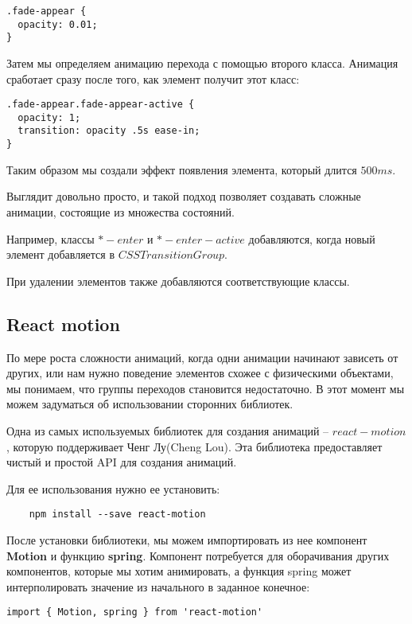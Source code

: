 \begin{lstlisting}
.fade-appear {
  opacity: 0.01;
}
\end{lstlisting}

Затем мы определяем анимацию перехода с помощью второго класса. Анимация сработает сразу после того, как элемент получит этот класс:

\begin{lstlisting}
.fade-appear.fade-appear-active {
  opacity: 1;
  transition: opacity .5s ease-in;
}
\end{lstlisting}

Таким образом мы создали эффект появления элемента, который длится $500ms$.

Выглядит довольно просто, и такой подход позволяет создавать сложные анимации, состоящие из множества состояний.

Например, классы $*-enter$ и $*-enter-active$ добавляются, когда новый элемент добавляется в $CSSTransitionGroup$.

При удалении элементов также добавляются соответствующие классы.

\subsection{React motion}

По мере роста сложности анимаций, когда одни анимации начинают зависеть от других, или нам нужно поведение элементов схожее с физическими объектами, мы понимаем, что группы переходов становится недостаточно. В этот момент мы можем задуматься об использовании сторонних библиотек.

Одна из самых используемых библиотек для создания анимаций -- $react-motion$, которую поддерживает Ченг Лу(Cheng Lou). Эта библиотека предоставляет чистый и простой API для создания анимаций.

Для ее использования нужно ее установить:

\begin{lstlisting}
	npm install --save react-motion
\end{lstlisting}

После установки библиотеки, мы можем импортировать из нее компонент \textbf{Motion} и функцию \textbf{spring}. Компонент потребуется для оборачивания других компонентов, которые мы хотим анимировать, а функция spring может интерполировать значение из начального в заданное конечное:

\begin{lstlisting}
import { Motion, spring } from 'react-motion'
\end{lstlisting}

